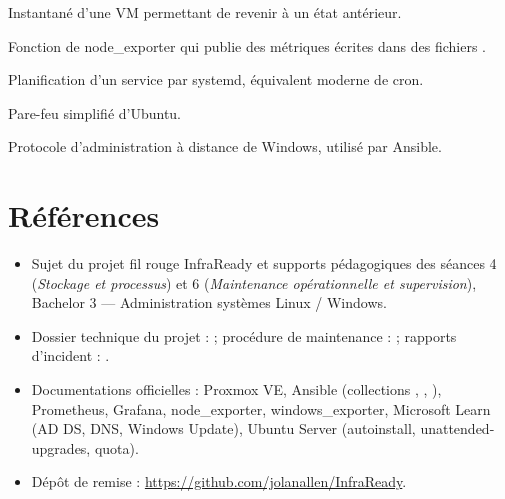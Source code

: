 \begin{description}[style=nextline,leftmargin=1.2cm]
  \item[Snapshot] Instantané d'une VM permettant de revenir à un état antérieur.
  \item[Textfile (collecteur)] Fonction de node\_exporter qui publie des métriques écrites dans des fichiers .
  \item[Timer systemd] Planification d'un service par systemd, équivalent moderne de cron.
  \item[UFW] Pare-feu simplifié d'Ubuntu.
  \item[WinRM] Protocole d'administration à distance de Windows, utilisé par Ansible.
\end{description}

\chapter{Références}\label{annexe:references}

\begin{itemize}
  \item Sujet du projet fil rouge InfraReady et supports pédagogiques des séances 4 (\emph{Stockage et
        processus}) et 6 (\emph{Maintenance opérationnelle et supervision}), Bachelor 3 — Administration
        systèmes Linux / Windows.
  \item Dossier technique du projet :  ; procédure de
        maintenance :  ; rapports d'incident :
        .
  \item Documentations officielles : Proxmox VE, Ansible (collections ,
        , ), Prometheus, Grafana, node\_exporter,
        windows\_exporter, Microsoft Learn (AD DS, DNS, Windows Update), Ubuntu Server
        (autoinstall, unattended-upgrades, quota).
  \item Dépôt de remise : \url{https://github.com/jolanallen/InfraReady}.
\end{itemize}
